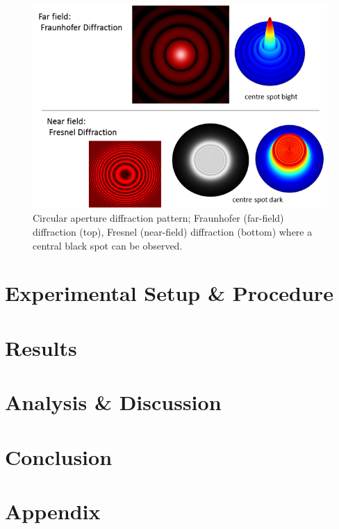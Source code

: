 \documentclass[12pt]{article}
\begin{document}
\begin{figure}[H]
    \centering
    \includegraphics[width=.65\textwidth]{circularapert.png}
    \caption{Circular aperture diffraction pattern; Fraunhofer (far-field) diffraction (top), Fresnel (near-field) diffraction (bottom) where a central black spot can be observed. \cite{VisualPhysics_singleSlit}}
    \label{fig:6}
\end{figure}

\section{Experimental Setup \& Procedure} \label{sec:3}


\section{Results} \label{sec:4}



\section{Analysis \& Discussion} \label{sec:5}



\section{Conclusion} \label{sec:6}


\newpage


\section*{Appendix} \label{sec:A}


 \label{sec:ref}

\vspace{1.5cm}
\end{document}
